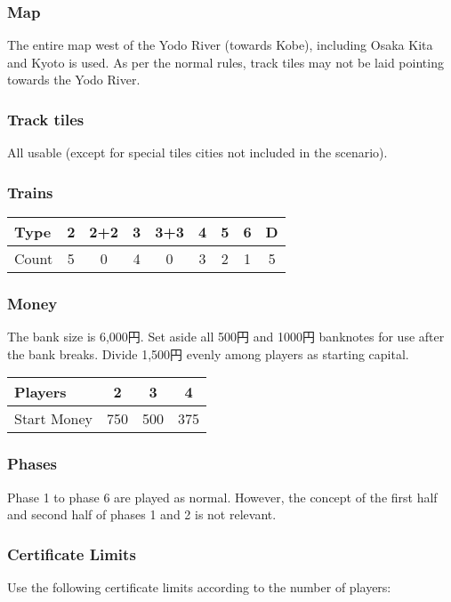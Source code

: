 \begin{multicols}{2}
\subsubsection{Map}

The entire map west of the Yodo River (towards Kobe), including Osaka
Kita and Kyoto is used. As per the normal rules, track tiles may not be laid
pointing towards the Yodo River.

\subsubsection{Track tiles}

All usable (except for special tiles cities not included in the scenario).

\subsubsection{Trains}

\begin{tabular}{l|cccccccc}
Type & 2 & 2+2 & 3 & 3+3 & 4 & 5 & 6 & D \\ \hline
Count & 5 & 0 & 4 & 0 & 3 & 2 & 1 & 5
\end{tabular}

\subsubsection{Money}
The bank size is 6,000円. Set aside all 500円 and 1000円
banknotes for use after the bank breaks. Divide 1,500円 evenly
among players as starting capital.

\begin{tabular}{|l|c|c|c|}
\hline
Players & 2 & 3 & 4 \\
\hline
Start Money & 750 & 500 & 375 \\
\hline
\end{tabular}

\subsubsection{Phases}
Phase 1 to phase 6 are played as normal. However, the concept of the
first half and second half of phases 1 and 2 is not relevant.

\subsubsection{Certificate Limits}
Use the following certificate limits according to the number of players:


\end{multicols}

